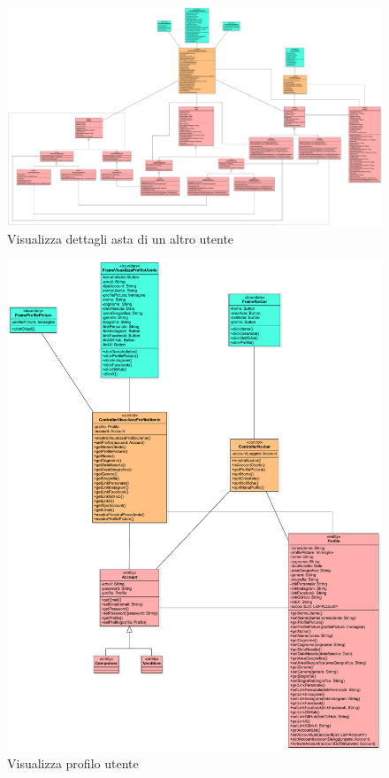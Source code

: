             \begin{figure}[htbp!]
                \centering
                    \includegraphics[width=1\linewidth]{Immagini/Diagrammi/Class Diagram/Analisi/Utente generico/VisualizzaDettagliAstaUtente.pdf}
                \caption{Visualizza dettagli asta di un altro utente}
            \end{figure}
            
            \begin{figure}[htbp!]
                \centering
                    \includegraphics[width=1\linewidth]{Immagini/Diagrammi/Class Diagram/Analisi/Utente generico/VisualizzaProfiloUtente.pdf}
                \caption{Visualizza profilo utente}
            \end{figure}
            
